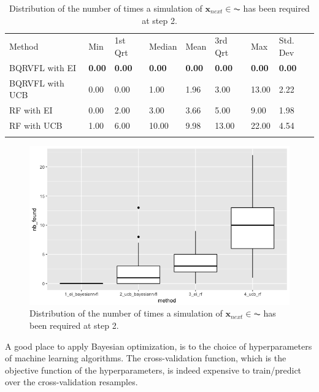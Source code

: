 \begin{table}[!htb]
\begin{center}
\caption{Distribution of the number of times a simulation of $\textbf{x}_{next} \in \AC$ has been required at step 2.}
\label{tab:nb_sims}       %
\begin{tabular}{llllllll}
\hline\noalign{\smallskip}
Method & Min & 1st Qrt  & Median & Mean  & 3rd Qrt  & Max & Std. Dev \\
\noalign{\smallskip}\hline\noalign{\smallskip}
 BQRVFL with EI  & \textbf{0.00} & \textbf{0.00} & \textbf{0.00}  & \textbf{0.00} & \textbf{0.00} & \textbf{0.00}  & \textbf{0.00} \\
 BQRVFL with UCB & 0.00 & 0.00 & 1.00  & 1.96 & 3.00 & 13.00 & 2.22 \\
 RF with EI      & 0.00 & 2.00 & 3.00  & 3.66 & 5.00 & 9.00 & 1.98 \\
 RF with UCB     & 1.00 & 6.00 & 10.00 & 9.98 & 13.00 & 22.00 & 4.54 \\
\noalign{\smallskip}\hline
\end{tabular}
\end{center}
\end{table}


\begin{figure}[!htb]
\centering
\includegraphics[width=12cm]{gfx/chapter-bayesianrvfl/nb_is_found.png}
\caption{Distribution of the number of times a simulation of $\textbf{x}_{next} \in \AC$ has been required at step 2.}
\label{nb_is_found_dist}
\end{figure}

A good place to apply Bayesian optimization, is to the choice of hyperparameters of machine learning algorithms. The cross-validation function, which is the objective function of the hyperparameters, is indeed expensive to train/predict over the cross-validation resamples.  

